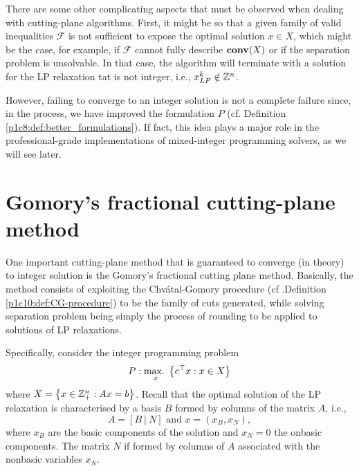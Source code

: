 There are some other complicating aspects that must be observed when dealing with cutting-plane algorithms. First, it might be so that a given family of valid inequalities $\mathcal{F}$ is not sufficient to expose the optimal solution $x \in X$, which might be the case, for example, if $\mathcal{F}$ cannot fully describe $\mathop{\bf conv}(X)$ or if the separation problem is unsolvable. In that case, the algorithm will terminate with a solution for the LP relaxation tat is not integer, i.e., $x_{LP}^k \notin \mathbb{Z}^n$. 

However, failing to converge to an integer solution is not a complete failure since, in the process, we have improved the formulation $P$ (cf. Definition \ref{p1c8:def:better_formulations}). If fact, this idea plays a major role in the professional-grade implementations of mixed-integer programming solvers, as we will see later. 


\section{Gomory's fractional cutting-plane method}

One important cutting-plane method that is guaranteed to converge (in theory) to integer solution is the Gomory's fractional cutting plane method. Basically, the method consists of exploiting the Chv\'atal-Gomory procedure (cf .Definition \ref{p1c10:def:CG-procedure}) to be the family of cuts generated, while solving separation problem being simply the process of rounding to be applied to solutions of LP relaxations. 

Specifically, consider the integer programming problem 
%
\begin{equation*}
	P: \mathop{\text{max.~}}_x\left\{ c^\top x : x \in X \right \}
\end{equation*}
%
where $X = \left\{ x \in \mathbb{Z}^n_+ : Ax = b \right \}$. Recall that the optimal solution of the LP relaxation is characterised by a basis $B$ formed by columns of the matrix $A$, i.e.,
%
\begin{equation*}
	A = [B ~|~ N] \text{ and } x = (x_B, x_N),	
\end{equation*}
%
where $x_B$ are the basic components of the solution and $x_N = 0$ the onbasic components. The matrix $N$ if formed by columns of $A$ associated with the nonbasic variables $x_N$.

